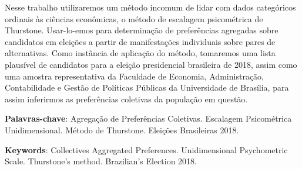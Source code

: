 \documentclass[
	article,			%
	12pt,				%
	oneside,			%
	a4paper,			%
	english,			%
	brazil,				%
	]{abntex2}
\begin{document}
\frenchspacing 


%
%
\maketitle
\begin{resumoumacoluna}
 Nesse trabalho utilizaremos um método incomum de lidar com dados categóricos ordinais às ciências econômicas, o método de escalagem psicométrica de Thurstone. Usar-lo-emos para determinação de preferências agregadas sobre candidatos em eleições a partir de manifestações individuais sobre pares de alternativas. Como instância de aplicação do método, tomaremos uma lista plausível de candidatos para a eleição presidencial brasileira de 2018, assim como uma amostra representativa da Faculdade de Economia, Administração, Contabilidade e Gestão de Políticas Públicas da Universidade de Brasília, para assim inferirmos as preferências coletivas da população em questão.
 
 \vspace{\onelineskip}
 
 \noindent
 \textbf{Palavras-chave}: Agregação de Preferências Coletivas. Escalagem Psicométrica Unidimensional. Método de Thurstone. Eleições Brasileiras 2018.
 
 \vspace{\onelineskip}
 
 \noindent
 \textbf{Keywords}: Collectives Aggregated Preferences. Unidimensional Psychometric Scale. Thurstone's method. Brazilian's Election 2018.
 
 \end{resumoumacoluna}


\textual

\end{document}
